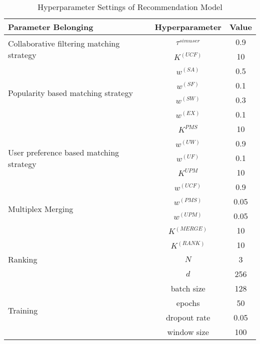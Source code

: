 \begin{table}[htbp]
  \caption{Hyperparameter Settings of Recommendation Model}\label{table:ch4-hpsetting}
  \centering
  \begin{tabular}{l c c}
    \toprule
    Parameter Belonging       & Hyperparameter     & Value \\
    \midrule
    \multirow{2}{*}{Collaborative filtering matching strategy}
                              & \(\tau^{simuser}\) & 0.9   \\
                              & \(K^{(UCF)}\)      & 10    \\
    \midrule
    \multirow{4}{*}{Popularity based matching strategy}
                              & \(w^{(SA)}\)       & 0.5   \\
                              & \(w^{(SF)}\)       & 0.1   \\
                              & \(w^{(SW)}\)       & 0.3   \\
                              & \(w^{(EX)}\)       & 0.1   \\
                              & \(K^{PMS}\)        & 10    \\
    \midrule
    \multirow{3}{*}{User preference based matching strategy}
                              & \(w^{(UW)}\)       & 0.9   \\
                              & \(w^{(UF)}\)       & 0.1   \\
                              & \(K^{UPM}\)        & 10    \\
    \midrule
    \multirow{4}{*}{Multiplex Merging}
                              & \(w^{(UCF)}\)      & 0.9   \\
                              & \(w^{(PMS)}\)      & 0.05  \\
                              & \(w^{(UPM)}\)      & 0.05  \\
                              & \(K^{(MERGE)}\)    & 10    \\
    \midrule
    \multirow{3}{*}{Ranking}  & \(K^{(RANK)}\)     & 10    \\
                              & \(N\)              & 3     \\
                              & \(d\)              & 256   \\
    \midrule
    \multirow{4}{*}{Training} & batch size         & 128   \\
                              & epochs             & 50    \\
                              & dropout rate       & 0.05  \\
                              & window size        & 100   \\
    \bottomrule
  \end{tabular}
\end{table}


